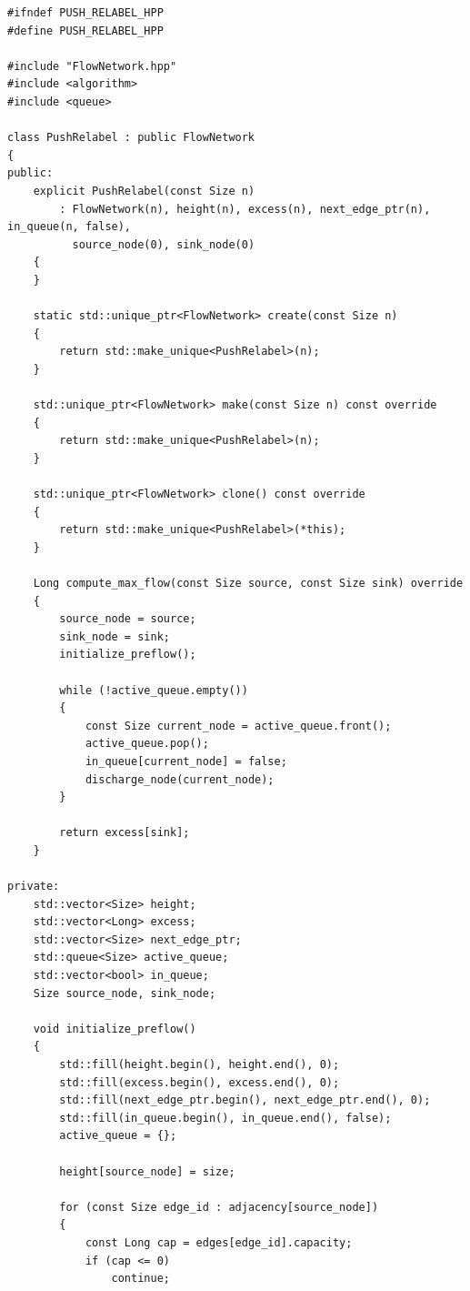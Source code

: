 \newpage

\label{ap:push_relabel}

\begin{lstlisting}[caption={Implementação em C++ da classe \lstinline{PushRelabel}, baseada no método de pré-fluxos e política de processamento em fila (FIFO).}, label={lst:push_relabel}]
#ifndef PUSH_RELABEL_HPP
#define PUSH_RELABEL_HPP

#include "FlowNetwork.hpp"
#include <algorithm>
#include <queue>

class PushRelabel : public FlowNetwork
{
public:
	explicit PushRelabel(const Size n)
	    : FlowNetwork(n), height(n), excess(n), next_edge_ptr(n), in_queue(n, false),
	      source_node(0), sink_node(0)
	{
	}

	static std::unique_ptr<FlowNetwork> create(const Size n)
	{
		return std::make_unique<PushRelabel>(n);
	}

	std::unique_ptr<FlowNetwork> make(const Size n) const override
	{
		return std::make_unique<PushRelabel>(n);
	}

	std::unique_ptr<FlowNetwork> clone() const override
	{
		return std::make_unique<PushRelabel>(*this);
	}

	Long compute_max_flow(const Size source, const Size sink) override
	{
		source_node = source;
		sink_node = sink;
		initialize_preflow();

		while (!active_queue.empty())
		{
			const Size current_node = active_queue.front();
			active_queue.pop();
			in_queue[current_node] = false;
			discharge_node(current_node);
		}

		return excess[sink];
	}

private:
	std::vector<Size> height;
	std::vector<Long> excess;
	std::vector<Size> next_edge_ptr;
	std::queue<Size> active_queue;
	std::vector<bool> in_queue;
	Size source_node, sink_node;

	void initialize_preflow()
	{
		std::fill(height.begin(), height.end(), 0);
		std::fill(excess.begin(), excess.end(), 0);
		std::fill(next_edge_ptr.begin(), next_edge_ptr.end(), 0);
		std::fill(in_queue.begin(), in_queue.end(), false);
		active_queue = {};

		height[source_node] = size;

		for (const Size edge_id : adjacency[source_node])
		{
			const Long cap = edges[edge_id].capacity;
			if (cap <= 0)
				continue;


\end{lstlisting}
